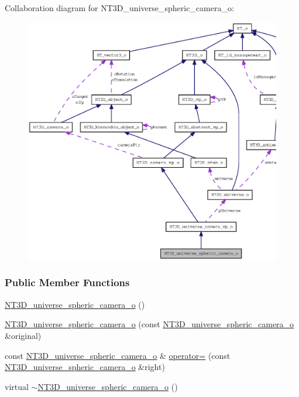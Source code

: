Collaboration diagram for NT3D\_\-universe\_\-spheric\_\-camera\_\-o:
\nopagebreak
\begin{figure}[H]
\begin{center}
\leavevmode
\includegraphics[width=400pt]{class_n_t3_d__universe__spheric__camera__o__coll__graph}
\end{center}
\end{figure}
\subsubsection*{Public Member Functions}
\begin{DoxyCompactItemize}
\item 
\hyperlink{class_n_t3_d__universe__spheric__camera__o_ab0ef1350dd416ac0c53d623aa04b716a}{NT3D\_\-universe\_\-spheric\_\-camera\_\-o} ()
\item 
\hyperlink{class_n_t3_d__universe__spheric__camera__o_ad93b6b18405ea19ef033ca9f12c6e23b}{NT3D\_\-universe\_\-spheric\_\-camera\_\-o} (const \hyperlink{class_n_t3_d__universe__spheric__camera__o}{NT3D\_\-universe\_\-spheric\_\-camera\_\-o} \&original)
\item 
const \hyperlink{class_n_t3_d__universe__spheric__camera__o}{NT3D\_\-universe\_\-spheric\_\-camera\_\-o} \& \hyperlink{class_n_t3_d__universe__spheric__camera__o_a9e7e198b8aa15d819f0faf3ca4a51d4a}{operator=} (const \hyperlink{class_n_t3_d__universe__spheric__camera__o}{NT3D\_\-universe\_\-spheric\_\-camera\_\-o} \&right)
\item 
virtual \hyperlink{class_n_t3_d__universe__spheric__camera__o_a8e85d6d7442729f765f9efb8963080cf}{$\sim$NT3D\_\-universe\_\-spheric\_\-camera\_\-o} ()
\end{DoxyCompactItemize}


